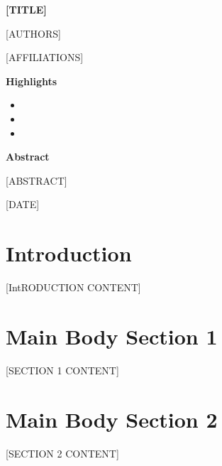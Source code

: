 \documentclass[12pt,a4paper]{article}
\begin{document}
\begin{titlepage}
\centering
\vspace*{2cm}

{\Huge\bfseries [TITLE]\par}

\vspace{1cm}

{\Large [AUTHORS]\par}

\vspace{0.5cm}

{\large [AFFILIATIONS]\par}

\vspace{2cm}

{\large\textbf{Highlights}\par}

\vspace{0.5cm}

\begin{itemize}
\item [HIGHLIGHT 1]
\item [HIGHLIGHT 2]
\item [HIGHLIGHT 3]
\end{itemize}

\vspace{1cm}

{\large\textbf{Abstract}\par}

\vspace{0.5cm}

{\large [ABSTRACT]\par}

\vspace{2cm}

{\large [DATE]\par}

\end{titlepage}

\tableofcontents
\newpage

\section{Introduction}
[IntRODUCTION CONTENT]

\section{Main Body Section 1}
[SECTION 1 CONTENT]

\section{Main Body Section 2}
[SECTION 2 CONTENT]
\end{document}
